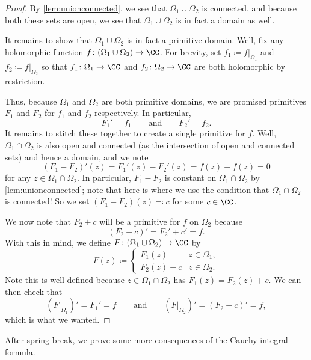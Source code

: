 \documentclass[../notes.tex]{subfiles}
\begin{document}
\begin{proof}
	By \autoref{lem:unionconnected}, we see that $\Omega_1\cup\Omega_2$ is connected, and because both these sets are open, we see that $\Omega_1\cup\Omega_2$ is in fact a domain as well.
	
	It remains to show that $\Omega_1\cup\Omega_2$ is in fact a primitive domain. Well, fix any holomorphic function $f\colon (\Omega_1\cup\Omega_2)\to\CC$. For brevity, set $f_1\coloneqq f|_{\Omega_1}$ and $f_2\coloneqq f|_{\Omega_2}$ so that $f_1\colon \Omega_1\to\CC$ and $f_2\colon \Omega_2\to\CC$ are both holomorphic by restriction.

	Thus, because $\Omega_1$ and $\Omega_2$ are both primitive domains, we are promised primitives $F_1$ and $F_2$ for $f_1$ and $f_2$ respectively. In particular,
	\[F_1'=f_1\qquad\text{and}\qquad F_2'=f_2.\]
	It remains to stitch these together to create a single primitive for $f$. Well, $\Omega_1\cap\Omega_2$ is also open and connected (as the intersection of open and connected sets) and hence a domain, and we note
	\[(F_1-F_2)'(z)=F_1'(z)-F_2'(z)=f(z)-f(z)=0\]
	for any $z\in\Omega_1\cap\Omega_2$. In particular, $F_1-F_2$ is constant on $\Omega_1\cap\Omega_2$ by \autoref{lem:unionconnected}; note that here is where we use the condition that $\Omega_1\cap\Omega_2$ is connected! So we set $(F_1-F_2)(z)\eqqcolon c$ for some $c\in\CC$.

	We now note that $F_2+c$ will be a primitive for $f$ on $\Omega_2$ because
	\[(F_2+c)'=F_2'+c'=f.\]
	With this in mind, we define $F\colon (\Omega_1\cup\Omega_2)\to\CC$ by
	\[F(z)\coloneqq \begin{cases}
		F_1(z) & z\in\Omega_1, \\
		F_2(z)+c & z\in\Omega_2.
	\end{cases}\]
	Note this is well-defined because $z\in\Omega_1\cap\Omega_2$ has $F_1(z)=F_2(z)+c$. We can then check that
	\[(F|_{\Omega_1})'=F_1'=f\qquad\text{and}\qquad(F|_{\Omega_2})'=(F_2+c)'=f,\]
	which is what we wanted.
\end{proof}
After spring break, we prove some more consequences of the Cauchy integral formula.
\end{document}
